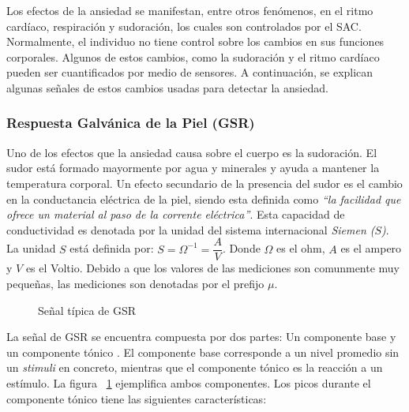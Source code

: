 Los efectos de la ansiedad se manifestan, entre otros fen\'omenos, en el ritmo card\'iaco, respiraci\'on y sudoraci\'on, los cuales son controlados por el SAC. Normalmente, el individuo no tiene control sobre los cambios en sus funciones corporales. Algunos de estos cambios, como la sudoraci\'on y el ritmo card\'iaco pueden ser cuantificados por medio de sensores. A continuaci\'on, se explican algunas se\~nales de estos cambios usadas para detectar la ansiedad.

	\subsubsection{Respuesta Galv\'anica de la Piel (GSR)}\label{secc:gsr}
	Uno de los efectos que la ansiedad causa sobre el cuerpo es la sudoraci\'on. El sudor est\'a formado mayormente por agua y minerales y ayuda a mantener la temperatura corporal. Un efecto secundario de la presencia del sudor es el cambio en la conductancia el\'ectrica de la piel, siendo esta definida como \textit{``la facilidad que ofrece un material al paso de la corrente el\'ectrica''}. Esta capacidad de conductividad es denotada por la unidad del sistema internacional \textit{Siemen ($S$)}. La unidad $S$ est\'a definida por: $S = \Omega^{-1} = \dfrac{A}{V}$. Donde $\Omega$ es el ohm, $A$ es el ampero y $V$ es el Voltio. Debido a que los valores de las mediciones son comunmente muy peque\~nas, las mediciones son denotadas por el prefijo $\mu$.
	\begin{figure}[h]
		\centering
		\caption{Se\~nal t\'ipica de GSR \label{fig:GSRsignal}}
	\end{figure}

	La se\~nal de GSR se encuentra compuesta por dos partes: Un componente base y un componente t\'onico \citep{Katsis2011261}. El componente base corresponde a un nivel promedio sin un \textit{stimuli} en concreto, mientras que el componente t\'onico es la reacci\'on a un est\'imulo. La figura ~\ref{fig:GSRsignal} ejemplifica ambos componentes. Los picos durante el componente t\'onico tiene las siguientes caracter\'isticas:

